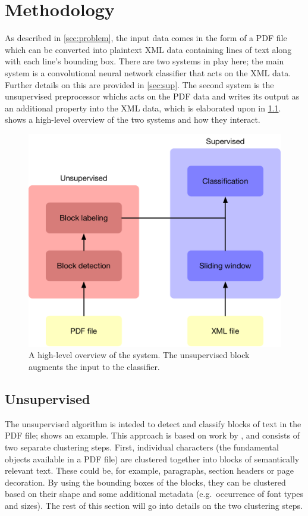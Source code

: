 \section{Methodology}%
\label{sec:method}

As described in \cref{sec:problem}, the input data comes in the form of a
PDF file which can be converted into plaintext XML data containing lines of text
along with each line's bounding box. There are two systems in play here; the
main system is a convolutional neural network classifier that acts on the XML
data. Further details on this are provided in \cref{sec:sup}. The second
system is the unsupervised preprocessor whichs acts on the PDF data and writes
its output as an additional property into the XML data, which is elaborated upon
in \cref{sec:unsup}.  shows a high-level
overview of the two systems and how they interact.

\begin{figure}[tb]
  \centering
  \includegraphics[width=\textwidth]{figures/layout.pdf}
  \caption{A high-level overview of the system. The unsupervised block augments
  the input to the classifier.\label{fig:overview}}
\end{figure}

\subsection{Unsupervised}%
\label{sec:unsup}
The unsupervised algorithm is inteded to detect and classify blocks of text in the
PDF file;  shows an example. This approach is based on
work by \textcite{klampfl2014unsupervised}, and consists of two separate
clustering steps. First, individual characters (the fundamental objects
available in a PDF file) are clustered together into blocks of semantically
relevant text. These could be, for example,  paragraphs, section headers or page decoration.
By using the bounding boxes of the blocks, they can be clustered based on their
shape and some additional metadata (e.g.\ occurrence of font types and sizes).
The rest of this section will go into details on the two clustering steps.

